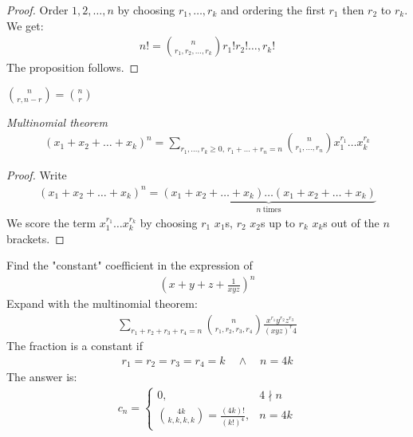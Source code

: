 \begin{proof}
	Order $1,2, \dots,n$ by choosing $r_1, \dots, r_k$ and ordering the first $r_1$ then $r_2$ to $r_k$. We get:
	\begin{align*}
	n!= \binom n  {r_1, r_2, \dots, r_k} r_1! r_2! \dots, r_k!
	\end{align*}
	The proposition follows.
\end{proof}

\begin{rk}
	$\displaystyle \binom n {r,n-r} = \binom n r$
\end{rk}

\begin{tm}
	\emph{Multinomial theorem} \\
	\begin{align*}
	(x_1+ x_2+ \dots + x_k)^n = \sum_{r_1, \dots, r_k \ge 0, ~r_1 +\dots+ r_n = n} \binom n {r_1, \dots, r_n} x_1^{r_1} \dots x_k ^{r_k}
	\end{align*}
\end{tm}

\begin{proof}
	Write 
	\begin{align*}
	(x_1+ x_2+ \dots + x_k)^n = \underbrace{(x_1+ x_2+ \dots + x_k) \dots (x_1+ x_2+ \dots + x_k)}_{n~\text{times}}
	\end{align*}
	We score the term $x_1^{r_1} \dots x_k ^{r_k}$ by choosing $r_1$ $x_1$s, $r_2$ $x_2$s up to $r_k$ $x_k$s out of the $n$ brackets.
\end{proof}

\begin{ex}
	Find the "constant" coefficient in the expression of
	\begin{align*}
	\left(x+y+z + \frac 1 {xyz} \right)^n
	\end{align*}
	Expand with the multinomial theorem:
	\begin{align*}
	\sum_{r_1+r_2+r_3+r_4 = n} \binom n {r_1, r_2, r_3, r_4} \frac{x^{r_1} y^{r_2} z^{r_3}}{(xyz)^r4}
	\end{align*}
	The fraction is a constant if
	\begin{align*}
	r_1=r_2=r_3=r_4=k \quad \wedge \quad n = 4k
	\end{align*}
	The answer is:
	\begin{align*}
	c_n = \left\{ \begin{array}{ll}
	0, &  4 \nmid n \\
	\binom{4k}{k,k,k,k} = \frac{(4k)!}{(k!)^4}, &  n = 4k
	\end{array}
	\right.
	\end{align*}
\end{ex}


